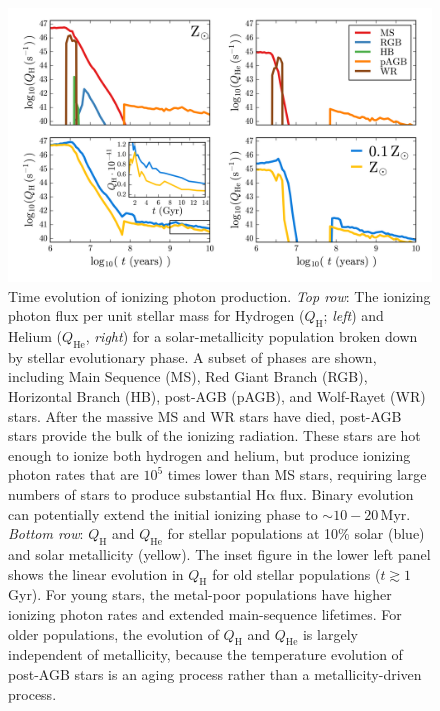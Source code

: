\documentclass[preprint2]{aastex62}
\newcommand{\ha}{\ensuremath{\mathrm{H\alpha}}\xspace}
\newcommand{\QH}{\ensuremath{Q_{\mathrm{H}}}\xspace}
\newcommand{\QHe}{\ensuremath{Q_{\mathrm{He}}}\xspace}
\newcommand{\Myr}{$\,$Myr\xspace}
\begin{document}
\begin{figure}
  \begin{center}
    \includegraphics[width=\linewidth]{figs/f3.png}
    \caption{{\sc Time evolution of ionizing photon production.} \emph{Top row}: The ionizing photon flux per unit stellar mass for Hydrogen (\QH; \emph{left}) and Helium (\QHe, \emph{right}) for a solar-metallicity population broken down by stellar evolutionary phase. A subset of phases are shown, including Main Sequence (MS), Red Giant Branch (RGB), Horizontal Branch (HB), post-AGB (pAGB), and Wolf-Rayet (WR) stars. After the massive MS and WR stars have died, post-AGB stars provide the bulk of the ionizing radiation. These stars are hot enough to ionize both hydrogen and helium, but produce ionizing photon rates that are $10^5$ times lower than MS stars, requiring large numbers of stars to produce substantial \ha flux. Binary evolution can potentially extend the initial ionizing phase to $\sim10-20$\Myr. \emph{Bottom row}: \QH and \QHe for stellar populations at 10\% solar (blue) and solar metallicity (yellow). The inset figure in the lower left panel shows the linear evolution in \QH for old stellar populations ($t \gtrsim 1$ Gyr). For young stars, the metal-poor populations have higher ionizing photon rates and extended main-sequence lifetimes. For older populations, the evolution of \QH and \QHe is largely independent of metallicity, because the temperature evolution of post-AGB stars is an aging process rather than a metallicity-driven process.}
    \label{fig:QF}
  \end{center}
\end{figure}
\end{document}
